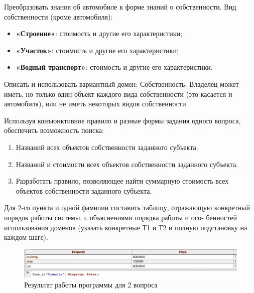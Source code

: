 \documentclass[a4paper,14pt, unknownkeysallowed]{extreport}
\begin{document}
Преобразовать знания об автомобиле к форме знаний о собственности. Вид собственности (кроме автомобиля):

\begin{itemize}
	\item \textbf{«Строение»}: стоимость и другие его характеристики;
	\item \textbf{«Участок»}: стоимость и другие его характеристики;
	\item \textbf{«Водный транспорт»}: стоимость и другие его характеристики.
\end{itemize}

Описать и использовать вариантный домен: Собственность. Владелец может иметь, но только один объект каждого вида собственности (это касается и автомобиля), или не иметь некоторых видов собственности. 

Используя конъюнктивное правило и разные формы задания одного вопроса, обеспечить возможность поиска:


\begin{enumerate}
	\item Названий всех объектов собственности заданного субъекта.
	\item Названий и стоимости всех объектов собственности заданного субъекта.
	\item Разработать правило, позволяющее найти суммарную стоимость всех объектов собственности заданного субъекта.
\end{enumerate}

Для 2-го пункта и одной фамилии составить таблицу, отражающую конкретный порядок работы системы, с объяснениями порядка работы и осо- бенностей использования доменов (указать конкретные Т1 и Т2 и полную подстановку на каждом шаге).



\begin{figure}[h]
	\centering
	\includegraphics[scale=0.5]{img/result.png}
	\caption{Результат работы программы для 2 вопроса}
	\label{fig:result1}
\end{figure}
\end{document}
